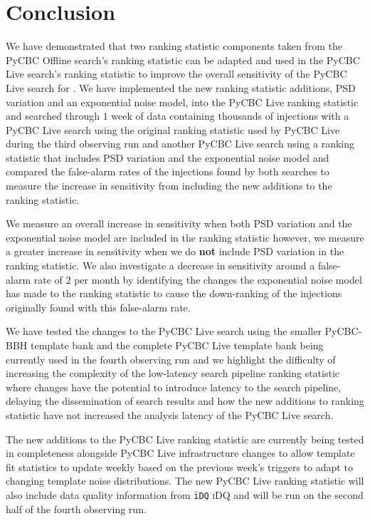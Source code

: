 \section{\label{5:sec:conclusion}Conclusion}

We have demonstrated that two ranking statistic components taken from the PyCBC Offline search's ranking statistic can be adapted and used in the PyCBC Live search's ranking statistic to improve the overall sensitivity of the PyCBC Live search for \gws. We have implemented the new ranking statistic additions, PSD variation and an exponential noise model, into the PyCBC Live ranking statistic and searched through $1$ week of \gwadj data containing thousands of \gwadj injections with a PyCBC Live search using the original ranking statistic used by PyCBC Live during the third observing run and another PyCBC Live search using a ranking statistic that includes PSD variation and the exponential noise model and compared the false-alarm rates of the injections found by both searches to measure the increase in sensitivity from including the new additions to the ranking statistic. 

We measure an overall increase in sensitivity when both PSD variation and the exponential noise model are included in the ranking statistic however, we measure a greater increase in sensitivity when we do \textbf{not} include PSD variation in the ranking statistic. We also investigate a decrease in sensitivity around a false-alarm rate of $2$ per month by identifying the changes the exponential noise model has made to the ranking statistic to cause the down-ranking of the injections originally found with this false-alarm rate.

We have tested the changes to the PyCBC Live search using the smaller PyCBC-BBH template bank and the complete PyCBC Live template bank being currently used in the fourth observing run and we highlight the difficulty of increasing the complexity of the low-latency search pipeline ranking statistic where changes have the potential to introduce latency to the search pipeline, delaying the dissemination of search results and how the new additions to ranking statistic have not increased the analysis latency of the PyCBC Live search.

The new additions to the PyCBC Live ranking statistic are currently being tested in completeness alongside PyCBC Live infrastructure changes to allow template fit statistics to update weekly based on the previous week's triggers to adapt to changing template noise distributions. The new PyCBC Live ranking statistic will also include data quality information from \verb|iDQ| \textsc{iDQ} and will be run on the second half of the fourth observing run.


